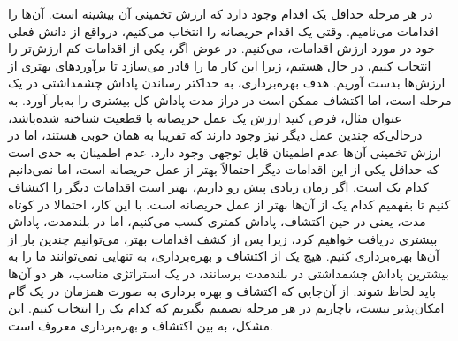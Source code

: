 در هر مرحله حداقل یک اقدام وجود دارد
که ارزش تخمینی آن بیشینه است. آن‌ها را اقدامات  می‌نامیم. وقتی یک اقدام حریصانه را انتخاب می‌کنیم،
درواقع از دانش فعلی خود در مورد ارزش اقدامات،  می‌کنیم. در عوض اگر،
یکی از اقدامات کم ارزش‌تر را انتخاب کنیم، در حال  هستیم، زیرا این کار ما را قادر می‌سازد تا برآوردهای بهتری از ارزش‌ها بدست آوریم. هدف بهره‌برداری، به حداکثر رساندن پاداش چشمداشتی در یک مرحله است، اما اکتشاف ممکن است در دراز مدت پاداش کل بیشتری را به‌بار‌ آورد.
به عنوان مثال، فرض کنید ارزش یک عمل حریصانه با قطعیت شناخته شده‌باشد، در‌حالی‌‌که چندین عمل دیگر نیز وجود دارند که
تقریبا به همان خوبی  هستند، اما در ارزش تخمینی آن‌ها عدم اطمینان قابل توجهی  وجود دارد. عدم اطمینان به حدی است که حداقل
یکی از این اقدامات دیگر احتمالاً بهتر از عمل حریصانه است، اما نمی‌دانیم کدام یک است.
اگر زمان زیادی پیش رو داریم، بهتر است
اقدامات دیگر را اکتشاف کنیم تا بفهمیم کدام یک از آن‌ها بهتر از عمل حریصانه است. با این کار، احتمالا در کوتاه مدت، یعنی در حین اکتشاف، پاداش کمتری کسب می‌کنیم، اما در بلندمدت، پاداش بیشتری دریافت خواهیم کرد، زیرا پس از کشف اقدامات بهتر، می‌توانیم چندین بار از آن‌ها بهره‌برداری کنیم. 
هیچ یک از اکتشاف و بهره‌برداری، به تنهایی نمی‌توانند ما را به بیشترین پاداش چشمداشتی در بلندمدت برسانند، در یک استراتژی مناسب، هر دو آن‌ها باید لحاظ شوند. از آن‌جایی که اکتشاف و بهره برداری به صورت همزمان در یک گام امکان‌پذیر نیست، ناچاریم در هر مرحله تصمیم بگیریم که کدام یک را انتخاب کنیم. این مشکل، به  بین اکتشاف و بهره‌برداری معروف است.


